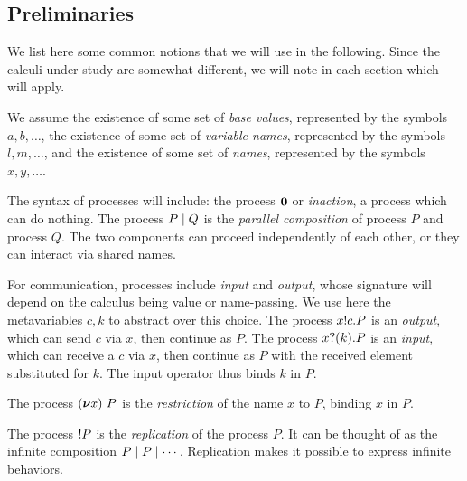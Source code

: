 \subsection{Preliminaries}
\label{sec:prelim}

We list here some common notions that we will use in the following. Since the calculi under study are somewhat different, we will note in each section which will apply.

We assume the existence of some set of \emph{base values}, represented by the symbols
\( a, b, \dots \), the existence of some set
of \emph{variable names}, represented by the symbols
\( l, m, \dots \), and the existence of some set of \emph{names},
represented by the symbols \( x, y, \dots \).  %

The syntax of processes will include:
the process \( \bm{0} \) or \emph{inaction}, a process which can do nothing. The process \( P \mid Q \) is the \emph{parallel composition} of process \( P \) and process \( Q \).
The two components can proceed independently of each other, or they can interact via shared names.

For communication, processes include \emph{input} and \emph{output}, whose
signature will depend on the calculus being value or name-passing.
We use here the metavariables $c,k$ to abstract over this choice.
The process \( x ! c . P \) is an \emph{output}, which can send
\( c \) via \( x \), then continue as \( P \).  %
The process \( x ? (k) . P \) is an \emph{input}, which can receive a $c$
via \( x \), then continue as \( P \) with the received element
substituted for \( k \).  The input operator thus
binds \( k \) in \( P \).

The process \( (\bm{\nu} x)~P \) is the \emph{restriction} of the name
\( x \) to \( P \), binding \( x \) in \( P \).


The process \( {!}P \) is the \emph{replication} of the process \( P \).
It can be thought of as the infinite composition \( P \mid P \mid \cdots \).
Replication makes it possible to express infinite behaviors.

